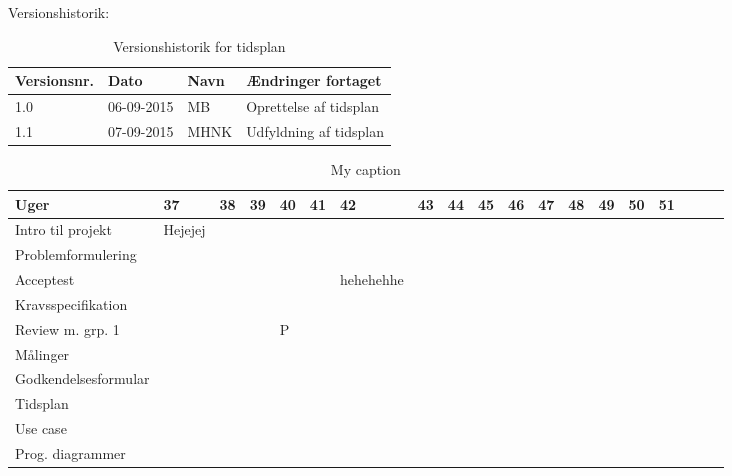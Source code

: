 \documentclass[12pt, letterpaper]{article}
\begin{document}
Versionshistorik:
\begin{table}[]
\centering
\caption{Versionshistorik for tidsplan}
\label{my-label}
\begin{tabular}{|l|l|l|l|}
\hline
Versionsnr. & Dato       & Navn & Ændringer fortaget     \\ \hline
1.0         & 06-09-2015 & MB   & Oprettelse af tidsplan \\ \hline
1.1         & 07-09-2015 & MHNK & Udfyldning af tidsplan \\ \hline
\end{tabular}
\end{table}

\begin{table}[]
\centering
\caption{My caption}
\label{my-label}
\begin{tabular}{|l|l|l|l|l|l|l|l|l|l|l|l|l|l|l|l|l|l|l|}
\hline
Uger                    & 37 & 38 & 39 & 40 & 41 & 42 & 43 & 44 & 45 & 46 & 47 & 48 & 49 & 50 & 51 &  &  &  \\ \hline
Intro til projekt       &  Hejejej  &    &    &    &    &    &    &    &    &    &    &    &    &    &    &  &  &  \\ \hline
Problemformulering      &    &    &    &    &    &    &    &    &    &    &    &    &    &    &    &  &  &  \\ \hline
Acceptest               &    &    &    &    &    &    hehehehhe    &    &    &    &    &    &    &    &    &  &  &  \\ \hline
Kravsspecifikation      &    &    &    &    &    &    &    &    &    &    &    &    &    &    &    &  &  &  \\ \hline
Review m. grp. 1        &    &    &    &  P &    &    &    &    &    &    &    &    &    &    &    &  &  &  \\ \hline
Målinger                &    &    &    &    &    &    &    &    &    &    &    &    &    &    &    &  &  &  \\ \hline
Godkendelsesformular    &    &    &    &    &    &    &    &    &    &    &    &    &    &    &    &  &  &  \\ \hline
Tidsplan                &    &    &    &    &    &    &    &    &    &    &    &    &    &    &    &  &  &  \\ \hline
Use case                &    &    &    &    &    &    &    &    &    &    &    &    &    &    &    &  &  &  \\ \hline
Prog. diagrammer        &    &    &    &    &    &    &    &    &    &    &    &    &    &    &    &  &  &  \\ \hline

\end{tabular}
\end{table}
\end{document}
